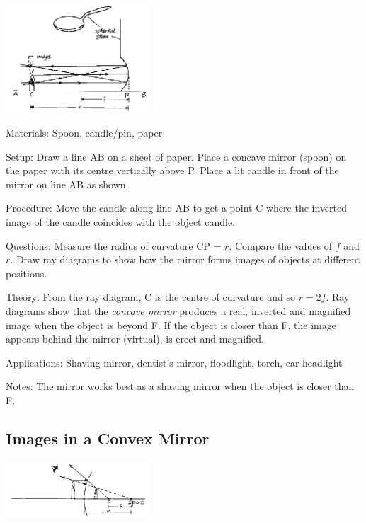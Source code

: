 \begin{multicols}{2}
\begin{center}
\includegraphics[width=0.4\textwidth]{./img/source/radius-concave.png}
\end{center}

\begin{description*}
\item[Materials:]{Spoon, candle/pin, paper}
\item[Setup:]{Draw a line AB on a sheet of paper. Place a concave mirror (spoon) on the paper with its centre vertically above P. Place a lit candle in front of the mirror on line AB as shown.}
\item[Procedure:]{Move the candle along line AB to get a point C where the inverted image of the candle coincides with the object candle.}
\item[Questions:]{Measure the radius of curvature CP = $r$. Compare the values of $f$ and $r$. Draw ray diagrams to show how the mirror forms images of objects at different positions.}
\item[Theory:]{From the ray diagram, C is the centre of curvature and so $r=2f$. Ray diagrams show that the \emph{concave mirror} produces a real, inverted and magnified image when the object is beyond F. If the object is closer than F, the image appears behind the mirror (virtual), is erect and magnified.}
\item[Applications:]{Shaving mirror, dentist's mirror, floodlight, torch, car headlight}
\item[Notes:]{The mirror works best as a shaving mirror when the object is closer than F.}
\end{description*}

\subsection{Images in a Convex Mirror}

\begin{center}
\includegraphics[width=0.4\textwidth]{./img/source/images-convex.png}
\end{center}


\end{multicols}
